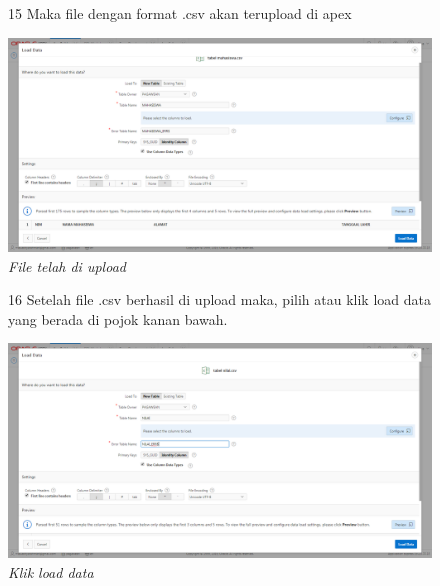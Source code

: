 \begin{enumerate}
\begin{figure}[!htbp]
\item[15] Maka file dengan format .csv akan terupload di apex
	\begin{center}
	\includegraphics[scale=0.2]{figures/tahap14.png}
	\caption{\textit{File telah di upload}}
	\end{center}	 
\end{figure}

\begin{figure}[!htbp]
\item[16] Setelah file .csv berhasil di upload maka, pilih atau klik load data yang berada di pojok kanan bawah.
	\begin{center}
	\includegraphics[scale=0.2]{figures/tahap18.png}
	\caption{\textit{Klik load data}}
	\end{center}	 
\end{figure}


\end{enumerate}

